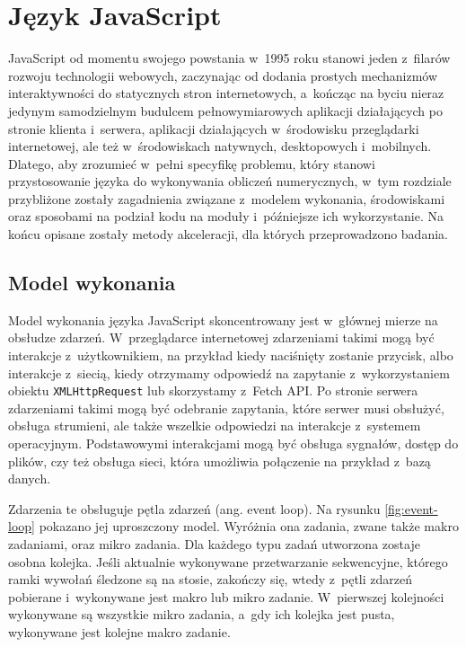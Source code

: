 \chapter{Język JavaScript}

JavaScript od momentu swojego powstania w~1995 roku stanowi jeden z~filarów rozwoju technologii webowych, zaczynając od dodania prostych mechanizmów interaktywności do statycznych stron internetowych, a~kończąc na byciu nieraz jedynym samodzielnym budulcem pełnowymiarowych aplikacji działających po stronie klienta i~serwera, aplikacji działających w~środowisku przeglądarki internetowej, ale też w~środowiskach natywnych, desktopowych i~mobilnych. Dlatego, aby zrozumieć w~pełni specyfikę problemu, który stanowi przystosowanie języka do wykonywania obliczeń numerycznych, w~tym rozdziale przybliżone zostały zagadnienia związane z~modelem wykonania, środowiskami oraz sposobami na podział kodu na moduły i~późniejsze ich wykorzystanie. Na końcu opisane zostały metody akceleracji, dla których przeprowadzono badania.



\section{Model wykonania}

Model wykonania języka JavaScript skoncentrowany jest w~głównej mierze na obsłudze zdarzeń. W~przeglądarce internetowej zdarzeniami takimi mogą być interakcje z~użytkownikiem, na przykład kiedy naciśnięty zostanie przycisk, albo interakcje z~siecią, kiedy otrzymamy odpowiedź na zapytanie z~wykorzystaniem obiektu \lstinline{XMLHttpRequest} lub skorzystamy z~Fetch API. Po stronie serwera zdarzeniami takimi mogą być odebranie zapytania, które serwer musi obsłużyć, obsługa strumieni, ale także wszelkie odpowiedzi na interakcje z~systemem operacyjnym. Podstawowymi interakcjami mogą być obsługa sygnałów, dostęp do plików, czy też obsługa sieci, która umożliwia połączenie na przykład z~bazą danych.

Zdarzenia te obsługuje pętla zdarzeń (ang. event loop). Na rysunku \ref{fig:event-loop} pokazano jej uproszczony model. Wyróżnia ona zadania, zwane także makro zadaniami, oraz mikro zadania. Dla każdego typu zadań utworzona zostaje osobna kolejka. Jeśli aktualnie wykonywane przetwarzanie sekwencyjne, którego ramki wywołań śledzone są na stosie, zakończy się, wtedy z~pętli zdarzeń pobierane i~wykonywane jest makro lub mikro zadanie. W~pierwszej kolejności wykonywane są wszystkie mikro zadania, a~gdy ich kolejka jest pusta, wykonywane jest kolejne makro zadanie.

